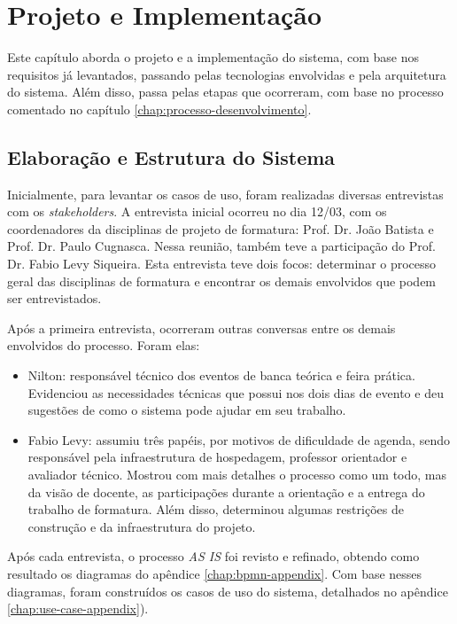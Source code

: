 \chapter{Projeto e Implementação}\label{chap:projeto-implementacao}
Este capítulo aborda o projeto e a implementação do sistema, com base nos requisitos já levantados, passando pelas tecnologias envolvidas e pela arquitetura do sistema. Além disso, passa pelas etapas que ocorreram, com base no processo comentado no capítulo \ref{chap:processo-desenvolvimento}.

\section{Elaboração e Estrutura do Sistema}
Inicialmente, para levantar os casos de uso, foram realizadas diversas entrevistas com os \textit{stakeholders}. A entrevista inicial ocorreu no dia 12/03, com os coordenadores da disciplinas de projeto de formatura: Prof. Dr. João Batista e Prof. Dr. Paulo Cugnasca. Nessa reunião, também teve a participação do Prof. Dr. Fabio Levy Siqueira. Esta entrevista teve dois focos: determinar o processo geral das disciplinas de formatura e encontrar os demais envolvidos que podem ser entrevistados.

Após a primeira entrevista, ocorreram outras conversas entre os demais envolvidos do processo. Foram elas:

\begin{itemize}
    \item Nilton: responsável técnico dos eventos de banca teórica e feira prática. Evidenciou as necessidades técnicas que possui nos dois dias de evento e deu sugestões de como o sistema pode ajudar em seu trabalho.
    \item Fabio Levy: assumiu três papéis, por motivos de dificuldade de agenda, sendo responsável pela infraestrutura de hospedagem, professor orientador e avaliador técnico. Mostrou com mais detalhes o processo como um todo, mas da visão de docente, as participações durante a orientação e a entrega do trabalho de formatura. Além disso, determinou algumas restrições de construção e da infraestrutura do projeto.
\end{itemize}

Após cada entrevista, o processo \textit{AS IS} foi revisto e refinado, obtendo como resultado os diagramas do apêndice \ref{chap:bpmn-appendix}. Com base nesses diagramas, foram construídos os casos de uso do sistema, detalhados no apêndice \ref{chap:use-case-appendix}). 

